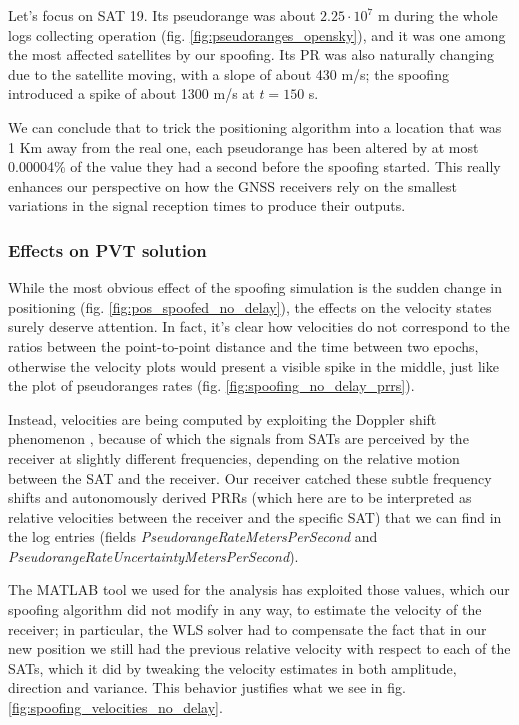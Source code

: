 Let's focus on SAT 19. Its pseudorange was about $2.25\cdot 10^7$ m during the whole logs collecting operation (fig. \ref{fig:pseudoranges_opensky}), and it was one among the most affected satellites by our spoofing. Its PR was also naturally changing due to the satellite moving, with a slope of about 430 m/s; the spoofing introduced a spike of about 1300 m/s at $t = 150$ s.

We can conclude that to trick the positioning algorithm into a location that was 1 Km away from the real one, each pseudorange has been altered by at most 0.00004\% of the value they had a second before the spoofing started. This really enhances our perspective on how the GNSS receivers rely on the smallest variations in the signal reception times to produce their outputs.

\subsubsection{Effects on PVT solution}
\label{sec:fratm}
While the most obvious effect of the spoofing simulation is the sudden change in positioning (fig. \ref{fig:pos_spoofed_no_delay}), the effects on the velocity states surely deserve attention. In fact, it's clear how velocities do not correspond to the ratios between the point-to-point distance and the time between two epochs, otherwise the velocity plots would present a visible spike in the middle, just like the plot of pseudoranges rates (fig. \ref{fig:spoofing_no_delay_prrs}).

Instead, velocities are being computed by exploiting the Doppler shift phenomenon \cite{psuDopplerShift2025}, because of which the signals from SATs are perceived by the receiver at slightly different frequencies, depending on the relative motion between the SAT and the receiver. Our receiver catched these subtle frequency shifts and autonomously derived PRRs (which here are to be interpreted as relative velocities between the receiver and the specific SAT) that we can find in the log entries (fields \textit{PseudorangeRateMetersPerSecond} and \textit{PseudorangeRateUncertaintyMetersPerSecond}). 

The MATLAB tool \cite{gpsMeasurementToolsCodebase} we used for the analysis has exploited those values, which our spoofing algorithm did not modify in any way, to estimate the velocity of the receiver; in particular, the WLS solver had to compensate the fact that in our new position we still had the previous relative velocity with respect to each of the SATs, which it did by tweaking the velocity estimates in both amplitude, direction and variance. This behavior justifies what we see in fig. \ref{fig:spoofing_velocities_no_delay}.


